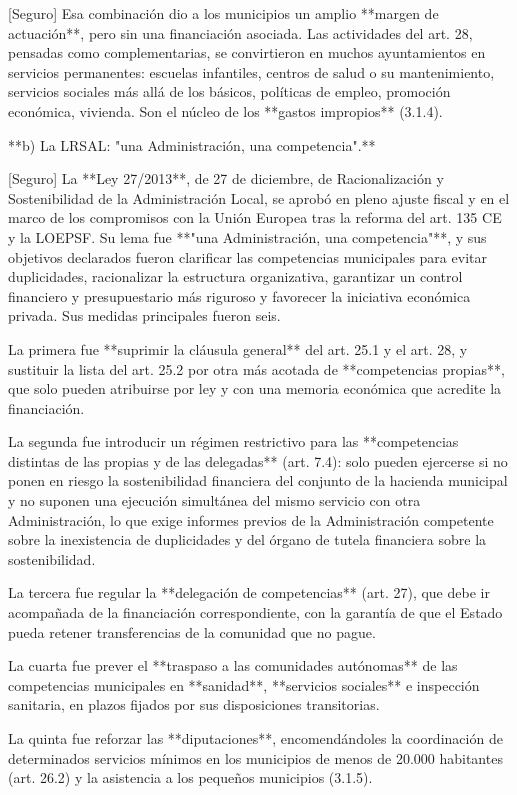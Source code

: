 \documentclass[10pt,a4paper]{article}
\begin{document}
[Seguro] Esa combinación dio a los municipios un amplio **margen de actuación**, pero sin una financiación asociada. Las actividades del art. 28, pensadas como complementarias, se convirtieron en muchos ayuntamientos en servicios permanentes: escuelas infantiles, centros de salud o su mantenimiento, servicios sociales más allá de los básicos, políticas de empleo, promoción económica, vivienda. Son el núcleo de los **gastos impropios** (3.1.4).

**b) La LRSAL: "una Administración, una competencia".**

[Seguro] La **Ley 27/2013**, de 27 de diciembre, de Racionalización y Sostenibilidad de la Administración Local, se aprobó en pleno ajuste fiscal y en el marco de los compromisos con la Unión Europea tras la reforma del art. 135 CE y la LOEPSF. Su lema fue **"una Administración, una competencia"**, y sus objetivos declarados fueron clarificar las competencias municipales para evitar duplicidades, racionalizar la estructura organizativa, garantizar un control financiero y presupuestario más riguroso y favorecer la iniciativa económica privada. Sus medidas principales fueron seis.

La primera fue **suprimir la cláusula general** del art. 25.1 y el art. 28, y sustituir la lista del art. 25.2 por otra más acotada de **competencias propias**, que solo pueden atribuirse por ley y con una memoria económica que acredite la financiación.

La segunda fue introducir un régimen restrictivo para las **competencias distintas de las propias y de las delegadas** (art. 7.4): solo pueden ejercerse si no ponen en riesgo la sostenibilidad financiera del conjunto de la hacienda municipal y no suponen una ejecución simultánea del mismo servicio con otra Administración, lo que exige informes previos de la Administración competente sobre la inexistencia de duplicidades y del órgano de tutela financiera sobre la sostenibilidad.

La tercera fue regular la **delegación de competencias** (art. 27), que debe ir acompañada de la financiación correspondiente, con la garantía de que el Estado pueda retener transferencias de la comunidad que no pague.

La cuarta fue prever el **traspaso a las comunidades autónomas** de las competencias municipales en **sanidad**, **servicios sociales** e inspección sanitaria, en plazos fijados por sus disposiciones transitorias.

La quinta fue reforzar las **diputaciones**, encomendándoles la coordinación de determinados servicios mínimos en los municipios de menos de 20.000 habitantes (art. 26.2) y la asistencia a los pequeños municipios (3.1.5).
\end{document}
